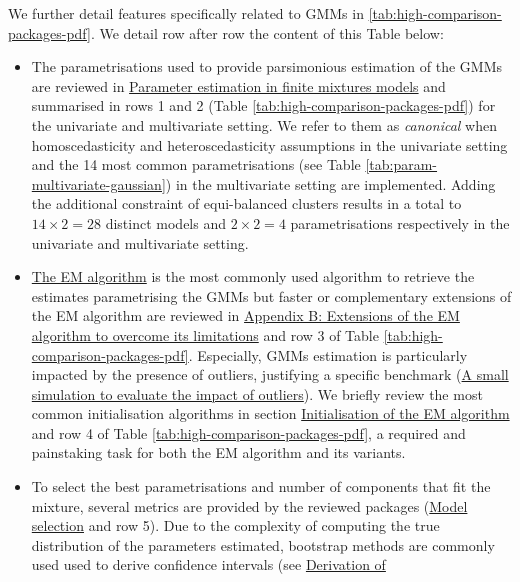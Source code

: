 \begin{table}[H]
{\begin{tabular}[t]{>{}l>{}l>{}l>{}l>{}r>{}l>{}l>{}r>{}l}
\midrule
\bottomrule
\end{tabular}}
\end{table}

We further detail features specifically related to GMMs in
\ref{tab:high-comparison-packages-pdf}. We detail row after row the content of this Table below:

\begin{itemize}
\item
  The parametrisations used to provide parsimonious estimation of the GMMs are reviewed in \protect\hyperlink{parameter-estimation-in-finite-mixtures-models}{Parameter estimation in finite mixtures models} and summarised in rows 1 and 2 (Table \ref{tab:high-comparison-packages-pdf}) for the univariate and multivariate setting. We refer to them as \emph{canonical} when homoscedasticity and heteroscedasticity assumptions in the univariate setting and the 14 most common parametrisations (see Table \ref{tab:param-multivariate-gaussian}) in the multivariate setting are implemented. Adding the additional constraint of equi-balanced clusters results in a total to \(14 \times 2=28\) distinct models and \(2 \times 2=4\) parametrisations respectively in the univariate and multivariate setting.
\item
  \protect\hyperlink{the-em-algorithm}{The EM algorithm} is the most commonly used
  algorithm to retrieve the estimates parametrising the GMMs but faster or complementary extensions of the EM algorithm are reviewed in \protect\hyperlink{appendix-b-extensions-of-the-em-algorithm-to-overcome-its-limitations}{Appendix B: Extensions of the EM algorithm to overcome its limitations} and row 3 of Table \ref{tab:high-comparison-packages-pdf}. Especially, GMMs estimation is particularly impacted by the presence of outliers, justifying a specific benchmark (\protect\hyperlink{a-small-simulation-to-evaluate-the-impact-of-outliers}{A small simulation to evaluate the impact of outliers}).
  We briefly review the most common initialisation algorithms in section \protect\hyperlink{initialisation-of-the-em-algorithm}{Initialisation of the EM algorithm} and row 4 of Table \ref{tab:high-comparison-packages-pdf}, a required and painstaking task for both the EM algorithm and its variants.
\item
  To select the best parametrisations and number of components that fit the mixture, several metrics are provided by the reviewed packages
  (\protect\hyperlink{model-selection}{Model selection} and row 5). Due to the complexity of computing the true distribution of the parameters estimated, bootstrap methods are commonly used used to derive confidence intervals (see \protect\hyperlink{derivation-of-confidence-intervals-in-gmms}{Derivation of
}
\end{itemize}
